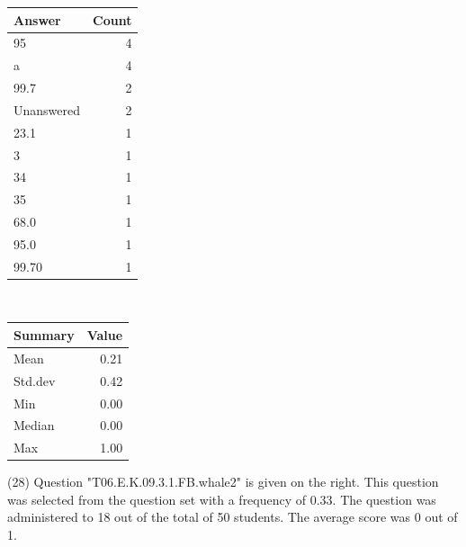 \documentclass[12pt,english,nohyper]{tufte-handout}\usepackage[]{graphicx}\usepackage[]{color}
\begin{document}
\begin{center}%
\begin{tabular}{lr}
  \hline
Answer & Count \\ 
  \hline
95 &   4 \\ 
  a &   4 \\ 
  99.7 &   2 \\ 
  Unanswered &   2 \\ 
  23.1 &   1 \\ 
  3 &   1 \\ 
  34 &   1 \\ 
  35 &   1 \\ 
  68.0 &   1 \\ 
  95.0 &   1 \\ 
  99.70 &   1 \\ 
   \hline
\end{tabular}
~~~~~~~~%
\begin{tabular}{lr}
  \hline
Summary & Value \\ 
  \hline
Mean & 0.21 \\ 
  Std.dev & 0.42 \\ 
  Min & 0.00 \\ 
  Median & 0.00 \\ 
  Max & 1.00 \\ 
   \hline
\end{tabular}
\end{center}\newpage{} (28) Question "T06.E.K.09.3.1.FB.whale2" is given on the right. This question was selected from the question set with a frequency of 0.33. The question was administered to 18 out of the total of 50 students. The average score was 0 out of 1.
\end{document}
